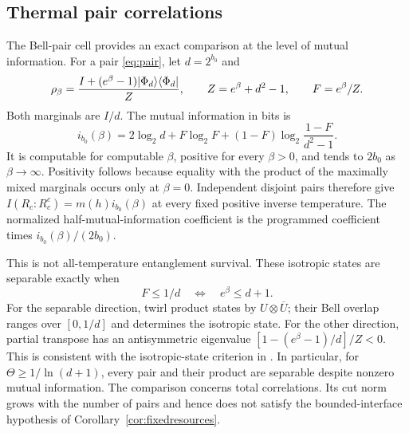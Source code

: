\subsection{Thermal pair correlations}\label{sec:thermalpairs}
The Bell-pair cell provides an exact comparison at the level of mutual
information. For a pair \eqref{eq:pair}, let $d=2^{b_0}$ and
\[
 \rho_\beta=\frac{I+(e^\beta-1)\lvert\Phi_d\rangle\langle\Phi_d\rvert}
                         {Z},\qquad Z=e^\beta+d^2-1,\qquad F=e^\beta/Z.
\]
Both marginals are $I/d$. The mutual information in bits is
\begin{equation}\label{eq:pairmi}
 i_{b_0}(\beta)=2\log_2d+F\log_2F
                +(1-F)\log_2\frac{1-F}{d^2-1}.
\end{equation}
It is computable for computable $\beta$, positive for every $\beta>0$,
and tends to $2b_0$ as $\beta\to\infty$. Positivity follows because
equality with the product of the maximally mixed marginals occurs only
at $\beta=0$. Independent disjoint pairs therefore give
$I(R_c:R_c^c)=m(h)i_{b_0}(\beta)$ at every fixed positive inverse
temperature. The normalized half-mutual-information coefficient is
the programmed coefficient times $i_{b_0}(\beta)/(2b_0)$.

This is not all-temperature entanglement survival. These isotropic
states are separable exactly when
\begin{equation}\label{eq:separable}
 F\leq1/d\quad\Longleftrightarrow\quad e^\beta\leq d+1.
\end{equation}
For the separable direction, twirl product states by
$U\otimes\overline U$; their Bell overlap ranges over $[0,1/d]$
and determines the isotropic state. For the other direction, partial
transpose has an antisymmetric eigenvalue
$[1-(e^\beta-1)/d]/Z<0$. This is consistent with the isotropic-state
criterion in \cite{horodecki}. In particular, for
$\Theta\geq1/\ln(d+1)$, every pair and their product are separable
despite nonzero mutual information. The comparison concerns total
correlations. Its cut norm grows with the number of pairs and hence
does not satisfy the bounded-interface hypothesis of
Corollary~\ref{cor:fixedresources}.
